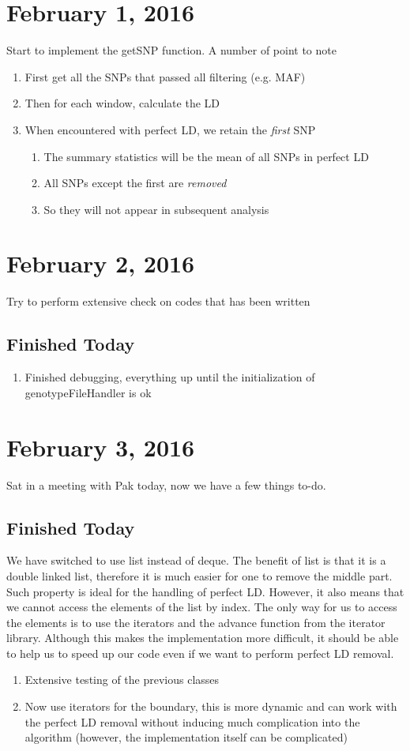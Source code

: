 \documentclass[12pt]{article}
\begin{document}
	\section{February 1, 2016}
	Start to implement the getSNP function. 
	A number of point to note
	\begin{enumerate}
		\item First get all the SNPs that passed all filtering (e.g. MAF)
		\item Then for each window, calculate the LD
		\item When encountered with perfect LD, we retain the \emph{first} SNP
		\begin{enumerate}
			\item The summary statistics will be the mean of all SNPs in perfect LD
			\item All SNPs except the first are \emph{removed} 
			\item So they will not appear in subsequent analysis
		\end{enumerate}
	\end{enumerate}
	
	\section{February 2, 2016}
	Try to perform extensive check on codes that has been written
	\subsection{Finished Today}
	\begin{enumerate}
		\item Finished debugging, everything up until the initialization of genotypeFileHandler is ok
	\end{enumerate}
	\section{February 3, 2016}
	Sat in a meeting with Pak today, now we have a few things to-do.
	
	\subsection{Finished Today}
	We have switched to use list instead of deque. 
	The benefit of list is that it is a double linked list, therefore it is much easier for one to remove the middle part.
	Such property is ideal for the handling of perfect LD. 
	However, it also means that we cannot access the elements of the list by index. 
	The only way for us to access the elements is to use the iterators and the advance function from the iterator library.
	Although this makes the implementation more difficult, it should be able to help us to speed up our code even if we want to perform perfect LD removal.
	\begin{enumerate}
		\item Extensive testing of the previous classes
		\item Now use iterators for the boundary, this is more dynamic and can work with the perfect LD removal without inducing much complication into the algorithm (however, the implementation itself can be complicated)
	\end{enumerate}
\end{document}
